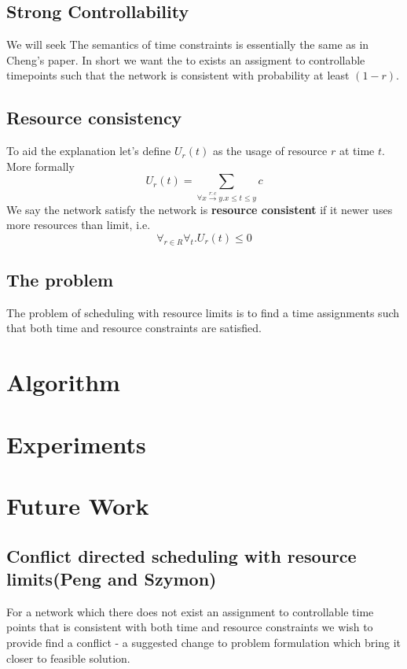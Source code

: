 \documentclass{article}
\begin{document}
\begin{multicols}{2}
\subsection{Strong Controllability}
We will seek
The semantics of time constraints is essentially the same as in Cheng's paper. In short we want the to exists an assigment to controllable timepoints such that the network is consistent with probability at least $(1-r)$.
\subsection{Resource consistency}
To aid the explanation let's define $U_r(t)$ as the usage of resource $r$ at time $t$. More formally
\[
U_r(t) = \sum_{\forall x \xrightarrow{r:c} y. x\leq t \leq y} c
\]
We say the network satisfy the network is \textbf{resource consistent} if it newer uses more resources than limit, i.e.
\[
\forall_{r \in R} \forall_{t} . U_r(t) \leq 0
\]
\subsection{The problem}
The problem of scheduling with resource limits is to find a time assignments such that both time and resource constraints are satisfied.


\section{Algorithm}
\blindtext[5]
\section{Experiments}
\blindtext[5]
\section{Future Work}
\subsection{Conflict directed scheduling with resource limits(Peng and Szymon)}
For a network which there does not exist an assignment to controllable time points that is consistent with both time and resource constraints we wish to provide find a conflict - a suggested change to problem formulation which bring it closer to feasible solution.

\end{multicols}
\end{document}
